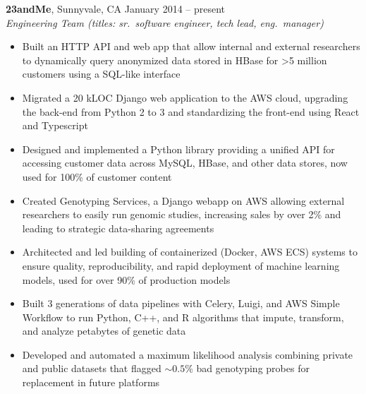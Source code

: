 \documentclass[margin,line]{resume}
\begin{document}
\begin{resume}
    \textbf{23andMe}, Sunnyvale, CA \hfill\vspace{1mm}\hfill January 2014 -- present\\%
    \textsl{Engineering Team (titles: sr.\ software engineer, tech lead, eng.\ manager)}
    \begin{itemize}
    \item Built an HTTP API and web app that allow internal and external researchers to dynamically query anonymized data stored in HBase for \textgreater 5 million customers using a SQL-like interface
    \item Migrated a 20 kLOC Django web application to the AWS cloud, upgrading the back-end from Python 2 to 3 and standardizing the front-end using React and Typescript
    \item Designed and implemented a Python library providing a unified API for accessing customer data across MySQL, HBase, and other data stores, now used for 100\% of customer content
    \item Created Genotyping Services, a Django webapp on AWS allowing external researchers to easily run genomic studies, increasing sales by over 2\% and leading to strategic data-sharing agreements
    \item Architected and led building of containerized (Docker, AWS ECS) systems to ensure quality, reproducibility, and rapid deployment of machine learning models, used for over 90\% of production models
    \item Built 3 generations of data pipelines with Celery, Luigi, and AWS Simple Workflow to run Python, C++, and R algorithms that impute, transform, and analyze petabytes of genetic data
    \item Developed and automated a maximum likelihood analysis combining private and public datasets that flagged \(\sim0.5\%\) bad genotyping probes for replacement in future platforms

\end{itemize}
\end{resume}
\end{document}
